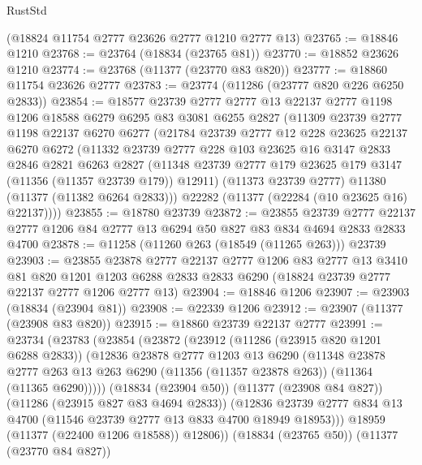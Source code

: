 \begin{lexlean}{RustStd}
\begin{coremodule}
    (@18824 @11754 @2777 @23626 @2777 @1210 @2777 @13)
@23765 := @18846 @1210
@23768 := @23764 (@18834 (@23765 @81))
@23770 := @18852 @23626 @1210
@23774 := @23768 (@11377 (@23770 @83 @820))
@23777 := @18860 @11754 @23626 @2777
@23783 := @23774 (@11286 (@23777 @820 @226 @6250 @2833))
@23854 := @18577
    @23739
    @2777
    @2777
    @13
    @22137
    @2777
    @1198
    @1206
    @18588
    @6279
    @6295
    @83
    @3081
    @6255
    @2827
    (@11309
      @23739
      @2777
      @1198
      @22137
      @6270
      @6277
      (@21784
        @23739
        @2777
        @12
        @228
        @23625
        @22137
        @6270
        @6272
        (@11332
          @23739
          @2777
          @228
          @103
          @23625
          @16
          @3147
          @2833
          @2846
          @2821
          @6263
          @2827
          (@11348 @23739 @2777 @179 @23625 @179 @3147 (@11356 (@11357 @23739 @179)) @12911)
          (@11373 @23739 @2777)
          @11380
          (@11377 (@11382 @6264 @2833)))
        @22282
        (@11377 (@22284 (@10 @23625 @16) @22137))))
@23855 := @18780 @23739
@23872 := @23855
    @23739
    @2777
    @22137
    @2777
    @1206
    @84
    @2777
    @13
    @6294
    @50
    @827
    @83
    @834
    @4694
    @2833
    @2833
    @4700
@23878 := @11258 (@11260 @263 (@18549 (@11265 @263))) @23739
@23903 := @23855
    @23878
    @2777
    @22137
    @2777
    @1206
    @83
    @2777
    @13
    @3410
    @81
    @820
    @1201
    @1203
    @6288
    @2833
    @2833
    @6290
    (@18824 @23739 @2777 @22137 @2777 @1206 @2777 @13)
@23904 := @18846 @1206
@23907 := @23903 (@18834 (@23904 @81))
@23908 := @22339 @1206
@23912 := @23907 (@11377 (@23908 @83 @820))
@23915 := @18860 @23739 @22137 @2777
@23991 := @23734
    (@23783
      (@23854
        (@23872
          (@23912
            (@11286 (@23915 @820 @1201 @6288 @2833))
            (@12836
              @23878
              @2777
              @1203
              @13
              @6290
              (@11348
                @23878
                @2777
                @263
                @13
                @263
                @6290
                (@11356 (@11357 @23878 @263))
                (@11364 (@11365 @6290)))))
          (@18834 (@23904 @50))
          (@11377 (@23908 @84 @827))
          (@11286 (@23915 @827 @83 @4694 @2833))
          (@12836 @23739 @2777 @834 @13 @4700 (@11546 @23739 @2777 @13 @833 @4700 @18949 @18953)))
        @18959
        (@11377 (@22400 @1206 @18588))
        @12806))
    (@18834 (@23765 @50))
    (@11377 (@23770 @84 @827))

\end{coremodule}
\end{lexlean}
